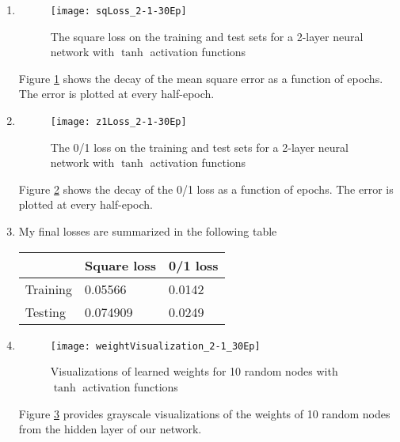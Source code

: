 \documentclass{article}
\begin{document}
\begin{enumerate}
\begin{itemize}
    \end{itemize}
    \item
    \begin{figure}
        \centering
        \texttt{[image: sqLoss\_2-1-30Ep]}
        \caption{The square loss on the training and test sets for a 2-layer neural network with $\tanh$ activation functions} 
        \label{fig:sqLoss_2-1}
    \end{figure}
    Figure \ref{fig:sqLoss_2-1} shows the decay of the mean square error as a function of epochs. The error is plotted at every half-epoch.
    \item
    \begin{figure}
        \centering
        \texttt{[image: z1Loss\_2-1-30Ep]}
        \caption{The 0/1 loss on the training and test sets for a 2-layer neural network with $\tanh$ activation functions} 
        \label{fig:z1Loss_2-1}
    \end{figure}
    Figure \ref{fig:z1Loss_2-1} shows the decay of the 0/1 loss as a function of epochs. The error is plotted at every half-epoch.
    \item My final losses are summarized in the following table

    \begin{tabular}{l|ll}
    & Square loss & 0/1 loss \\
    \hline
    Training &  0.05566 & 0.0142 \\
    Testing  &  0.074909 & 0.0249
    \end{tabular}
    \item 
    \begin{figure}
        \centering
        \texttt{[image: weightVisualization\_2-1\_30Ep]}
        \caption{Visualizations of learned weights for 10 random nodes with $\tanh$ activation functions} 
        \label{fig:weights2-1}
    \end{figure}
    Figure \ref{fig:weights2-1} provides grayscale visualizations of the weights of 10 random nodes from the hidden layer of our network.
\end{enumerate}
\end{document}
